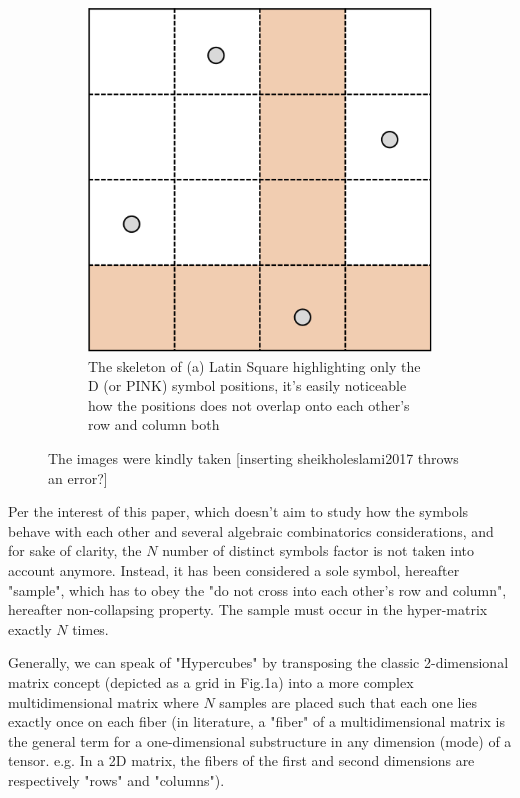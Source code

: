 \documentclass[12pt]{article}
\begin{document}
\begin{figure}[h]
\begin{subfigure}[b]{0.45\textwidth}
{        	\includegraphics[width=\textwidth]{src/imgs/latin_square_skeleton.png}
        	\caption{The skeleton of (a) Latin Square highlighting only the D (or PINK) symbol positions, it's easily noticeable how the positions does not overlap onto each other's row and column both}
        	\label{fig:latin_square_b}
        }
    \end{subfigure}
    \caption{The images were kindly taken [inserting sheikholeslami2017 throws an error?]
    }
    \label{fig:latin_square}
\end{figure}

Per the interest of this paper, which doesn't aim to study how the symbols behave with each other and several algebraic combinatorics considerations, and for sake of clarity, the $N$ number of distinct symbols factor is not taken into account anymore. Instead, it has been considered a sole symbol, hereafter "sample", which has to obey the "do not cross into each other's row and column", hereafter non-collapsing property. The sample must occur in the hyper-matrix exactly $N$ times.

Generally, we can speak of "Hypercubes" by transposing the classic 2-dimensional matrix concept (depicted as a grid in Fig.1a) into a more complex multidimensional matrix where $N$ samples are placed such that each one lies exactly once on each fiber (in literature, a "fiber" of a multidimensional matrix is the general term for a one-dimensional substructure in any dimension (mode) of a tensor. e.g. In a 2D matrix, the fibers of the first and second dimensions are respectively "rows" and "columns").
\end{document}
